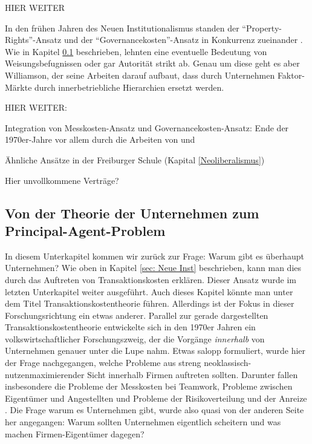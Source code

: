 HIER WEITER


In den frühen Jahren des Neuen Institutionalismus standen der "`Property-Rights"'-Ansatz und der "`Governancekosten"'-Ansatz in Konkurrenz zueinander \parencite[S. 190]{Erlei2016}. Wie in Kapitel \ref{sec: Theorie_Unternehmen} beschrieben, lehnten \textcite{Alchian1972} eine eventuelle Bedeutung von Weisungsbefugnissen oder gar Autorität strikt ab. Genau um diese geht es aber Williamson, der seine Arbeiten darauf aufbaut, dass durch Unternehmen Faktor-Märkte durch innerbetriebliche Hierarchien ersetzt werden.

HIER WEITER:


Integration von Messkosten-Ansatz und Governancekosten-Ansatz: Ende der 1970er-Jahre vor allem durch die Arbeiten von \textcite{Klein1978} und \textcite{Alchian1984}

Ähnliche Ansätze in der Freiburger Schule (Kapital \ref{Neoliberalismus})

Hier unvollkommene Verträge?






\subsection{Von der Theorie der Unternehmen zum Principal-Agent-Problem}
\label{sec: Theorie_Unternehmen}

In diesem Unterkapitel kommen wir zurück zur Frage: Warum gibt es überhaupt Unternehmen? Wie oben in Kapitel \ref{sec: Neue Inst} beschrieben, kann man dies durch das Auftreten von Transaktionskosten erklären. Dieser Ansatz wurde im letzten Unterkapitel weiter ausgeführt. Auch dieses Kapitel könnte man unter dem Titel Transaktionskostentheorie führen. Allerdings ist der Fokus in dieser Forschungsrichtung ein etwas anderer. Parallel zur gerade dargestellten Transaktionskostentheorie entwickelte sich in den 1970er Jahren ein volkswirtschaftlicher Forschungszweig, der die Vorgänge \textit{innerhalb} von Unternehmen genauer unter die Lupe nahm. Etwas salopp formuliert, wurde hier der Frage nachgegangen, welche Probleme aus streng neoklassisch-nutzenmaximierender Sicht innerhalb Firmen auftreten sollten. Darunter fallen insbesondere die Probleme der Messkosten bei Teamwork, Probleme zwischen Eigentümer und Angestellten und Probleme der Risikoverteilung und der Anreize \parencite[S. 67]{Erlei2016}. Die Frage warum es Unternehmen gibt, wurde also quasi von der anderen Seite her angegangen: Warum sollten Unternehmen eigentlich scheitern und was machen Firmen-Eigentümer dagegen? 

